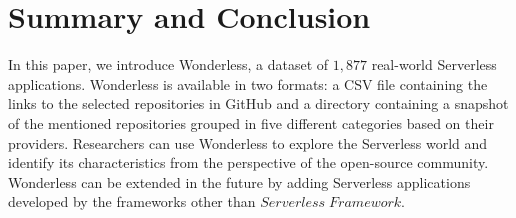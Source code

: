 \section{Summary and Conclusion}
\label{summary}

In this paper, we introduce Wonderless, a dataset of $1,877$ 
real-world Serverless applications. Wonderless is available in two 
formats: a CSV file containing the links to the selected repositories 
in GitHub and a directory containing a snapshot of the mentioned 
repositories grouped in five different categories based on their providers. 
Researchers can use Wonderless to explore the Serverless world and 
identify its characteristics from the perspective of the open-source 
community. Wonderless can be extended in the future by adding 
Serverless applications developed by the frameworks other than 
$Serverless \; Framework$.

